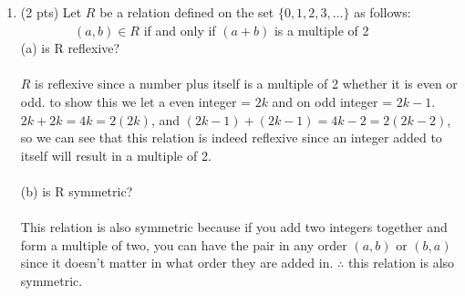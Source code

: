 \documentclass[12pt]{article}
\begin{document}
\begin{enumerate}
\item (2 pts)
Let \(R\) be a relation defined on the set \(\lbrace 0,1,2,3,\dots \rbrace\) as follows:
\leavevmode\\\relax
\(\hspace{50pt} (a,b) \in R\) if and only if \((a+b)\) is a multiple of 2
\leavevmode\\\relax
(a) is R reflexive?\\
\\$R$ is reflexive since a number plus itself is a multiple of 2 whether it is even or odd. to show this we let a even integer = $2k$ and on odd integer = $2k-1$. $2k + 2k = 4k = 2(2k)$, and $(2k-1) + (2k-1) = 4k-2 = 2(2k-2) $, so we can see that this relation is indeed reflexive since an integer added to itself will result in a multiple of 2.\\
\leavevmode\\\relax
(b) is R symmetric?\\
\\This relation is also symmetric because if you add two integers together and form a multiple of two, you can have the pair in any order $(a,b)$ or $(b,a)$ since it doesn't matter in what order they are added in. $\therefore$ this relation is also symmetric.


\end{enumerate}
\end{document}
